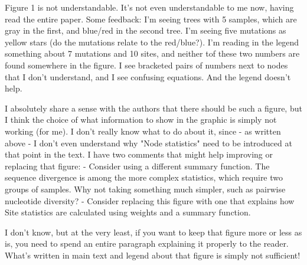 \begin{point}{}
Figure 1 is not understandable. It's not even understandable to me now, having read the entire paper. Some feedback: I'm seeing trees with 5 samples, which are gray in the first, and blue/red in the second tree. I'm seeing five mutations as yellow stars (do the mutations relate to the red/blue?). I'm reading in the legend something about 7 mutations and 10 sites, and neither tof these two numbers are found somewhere in the figure. I see bracketed pairs of numbers next to nodes that I don't understand, and I see confusing equations. And the legend doesn't help.

I absolutely share a sense with the authors that there should be such a figure, but I think the choice of what information to show in the graphic is simply not working (for me). I don't really know what to do about it, since - as written above - I don't even understand why "Node statistics" need to be introduced at that point in the text. I have two comments that might help improving or replacing that figure:
- Consider using a different summary function. The sequence divergence is among the more complex statistics, which require two groups of samples. Why not taking something much simpler, such as pairwise nucleotide diversity?
- Consider replacing this figure with one that explains how Site statistics are calculated using weights and a summary function.

I don't know, but at the very least, if you want to keep that figure more or less as is, you need to spend an entire paragraph explaining it properly to the reader. What's written in main text and legend about that figure is simply not sufficient!
\end{point}

\reply{
}

